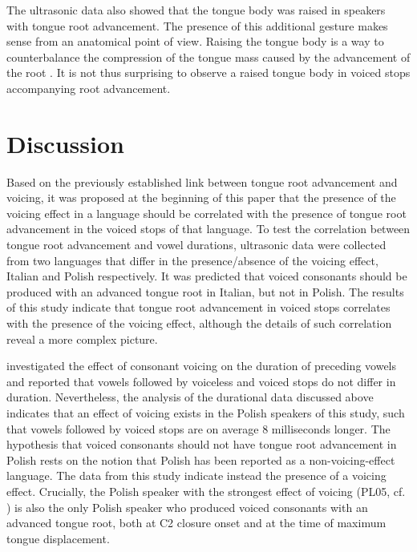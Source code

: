 \documentclass[authoryear, twocolumn]{elsarticle}
\begin{document}
The ultrasonic data also showed that the tongue body was raised in
speakers with tongue root advancement. The presence of this additional
gesture makes sense from an anatomical point of view. Raising the tongue
body is a way to counterbalance the compression of the tongue mass
caused by the advancement of the root
\citep{perkell1969, jackson1988, sproat1993, kingston1997, fulop1998}.
It is not thus surprising to observe a raised tongue body in voiced
stops accompanying root advancement.

\section{Discussion}\label{discussion}

\label{s:discussion}

Based on the previously established link between tongue root advancement
and voicing, it was proposed at the beginning of this paper that the
presence of the voicing effect in a language should be correlated with
the presence of tongue root advancement in the voiced stops of that
language. To test the correlation between tongue root advancement and
vowel durations, ultrasonic data were collected from two languages that
differ in the presence/absence of the voicing effect, Italian and Polish
respectively. It was predicted that voiced consonants should be produced
with an advanced tongue root in Italian, but not in Polish. The results
of this study indicate that tongue root advancement in voiced stops
correlates with the presence of the voicing effect, although the details
of such correlation reveal a more complex picture.

\citet{keating1984} investigated the effect of consonant voicing on the
duration of preceding vowels and reported that vowels followed by
voiceless and voiced stops do not differ in duration. Nevertheless, the
analysis of the durational data discussed above indicates that an effect
of voicing exists in the Polish speakers of this study, such that vowels
followed by voiced stops are on average 8 milliseconds longer. The
hypothesis that voiced consonants should not have tongue root
advancement in Polish rests on the notion that Polish has been reported
as a non-voicing-effect language. The data from this study indicate
instead the presence of a voicing effect. Crucially, the Polish speaker
with the strongest effect of voicing (PL05, cf. )
is also the only Polish speaker who produced voiced consonants with an
advanced tongue root, both at C2 closure onset and at the time of
maximum tongue displacement.
\end{document}
